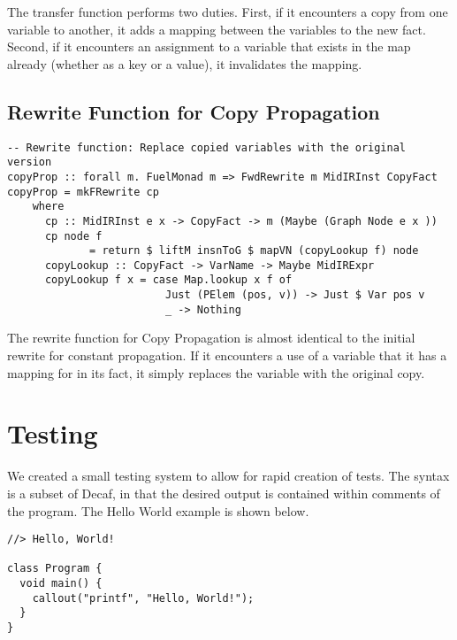 \documentclass[11pt]{article}
\begin{document}
The transfer function performs two duties. First, if it encounters a copy from one variable to another, it adds a mapping between the variables to the new fact. Second, if it encounters an assignment to a variable that exists in the map already (whether as a key or a value), it invalidates the mapping. 

\subsection { Rewrite Function for Copy Propagation }

\begin{verbatim}
-- Rewrite function: Replace copied variables with the original version 
copyProp :: forall m. FuelMonad m => FwdRewrite m MidIRInst CopyFact 
copyProp = mkFRewrite cp 
    where 
      cp :: MidIRInst e x -> CopyFact -> m (Maybe (Graph Node e x ))
      cp node f 
             = return $ liftM insnToG $ mapVN (copyLookup f) node 
      copyLookup :: CopyFact -> VarName -> Maybe MidIRExpr 
      copyLookup f x = case Map.lookup x f of 
                         Just (PElem (pos, v)) -> Just $ Var pos v 
                         _ -> Nothing
\end{verbatim}

The rewrite function for Copy Propagation is almost identical to the initial rewrite for constant propagation. If it encounters a use of a variable that it has a mapping for in its fact, it simply replaces the variable with the original copy. 

\section{Testing}
We created a small testing system to allow for rapid creation of tests. The syntax is a subset of Decaf, in that the desired output is contained within comments of the program. The Hello World example is shown below.

\begin{verbatim}
//> Hello, World!

class Program {
  void main() {
    callout("printf", "Hello, World!");
  }
}
\end{verbatim}
\end{document}
